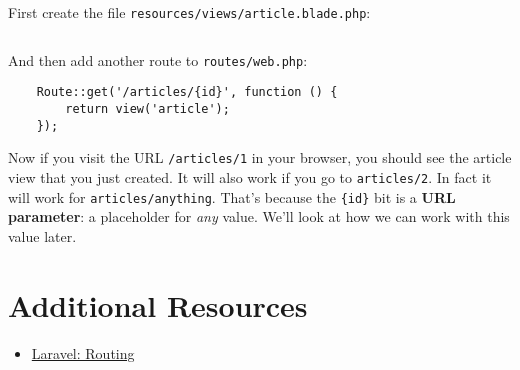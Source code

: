 First create the file \texttt{resources/views/article.blade.php}:

\inputminted{html}{07-routing/figures/02-article.blade.php}

And then add another route to \texttt{routes/web.php}:

\begin{verbatim}
    Route::get('/articles/{id}', function () {
        return view('article');
    });
\end{verbatim}

Now if you visit the URL \texttt{/articles/1} in your browser, you should see the article view that you just created. It will also work if you go to \texttt{articles/2}. In fact it will work for \texttt{articles/anything}. That's because the \texttt{\{id\}} bit is a \textbf{URL parameter}: a placeholder for \textit{any} value. We'll look at how we can work with this value later.

\section{Additional Resources}

\begin{itemize}[leftmargin=*]
    \item \href{http://laravel.com/docs/master/routing}{Laravel: Routing}
\end{itemize}
